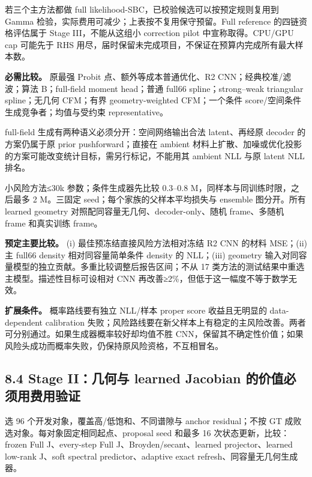 \documentclass[
  11pt,
  a4paper,
]{article}
\begin{document}
若三个主方法都做 full likelihood-SBC，已校验候选可以按预定规则复用到
Gamma 检验，实际费用可减少；上表按不复用保守预留。Full reference
的四链资格评估属于 Stage III，不能从这组小 correction pilot
中宣称取得。CPU/GPU cap 可能先于 RHS
用尽，届时保留未完成项目，不保证在预算内完成所有最大样本数。

\textbf{必需比较。} 原最强 Probit 点、额外等成本普通优化、R2
CNN；经典校准/滤波；算法 B；full-field moment head；普通 full66
spline；strong--weak triangular spline；无几何 CFM；有界
geometry-weighted CFM；一个条件 score/空间条件生成竞争者；均值与受约束
representative。

full-field 生成有两种语义必须分开：空间网络输出合法 latent、再经原
decoder 的方案仍属于原 prior pushforward；直接在 ambient
材料上扩散、加噪或优化投影的方案可能改变统计目标，需另行标记，不能用其
ambient NLL 与原 latent NLL 排名。

小风险方法≤30k 参数；条件生成器先比较 0.3--0.8
M，同样本与同训练时限，之后最多 2 M。三固定
seed；每个家族的父样本平均损失与 ensemble 图分开。所有 learned geometry
对照配同容量无几何、decoder-only、随机 frame、多随机 frame 和真实训练
frame。

\textbf{预定主要比较。} (i) 最佳预冻结直接风险方法相对冻结 R2 CNN 的材料
MSE；(ii) 主 full66 density 相对同容量简单条件 density 的 NLL；(iii)
geometry 输入对同容量模型的独立贡献。多重比较调整后报告区间；不从 17
类方法的测试结果中重选主模型。描述性目标可设相对 CNN
再改善≥2\%，但低于这一幅度不等于数学无效。

\textbf{扩展条件。} 概率路线要有独立 NLL/样本 proper score
收益且无明显的 data-dependent calibration
失败；风险路线要在新父样本上有稳定的主风险改善。两者可分别通过。如果生成器概率较好却均值不胜
CNN，保留其不确定性价值；如果风险头成功而概率失败，仍保持原风险资格，不互相冒名。

\hypertarget{stage-iiux51e0ux4f55ux4e0e-learned-jacobian-ux7684ux4ef7ux503cux5fc5ux987bux7528ux8d39ux7528ux9a8cux8bc1}{%
\subsection{8.4 Stage II：几何与 learned Jacobian
的价值必须用费用验证}\label{stage-iiux51e0ux4f55ux4e0e-learned-jacobian-ux7684ux4ef7ux503cux5fc5ux987bux7528ux8d39ux7528ux9a8cux8bc1}}

选 96 个开发对象，覆盖高/低饱和、不同谱隙与 anchor residual；不按 GT
成败选对象。每对象固定相同起点、proposal seed 和最多 16
次状态更新，比较：frozen Full J、every-step Full
J、Broyden/secant、learned projector、learned low-rank J、soft spectral
predictor、adaptive exact refresh、同容量无几何生成器。
\end{document}
